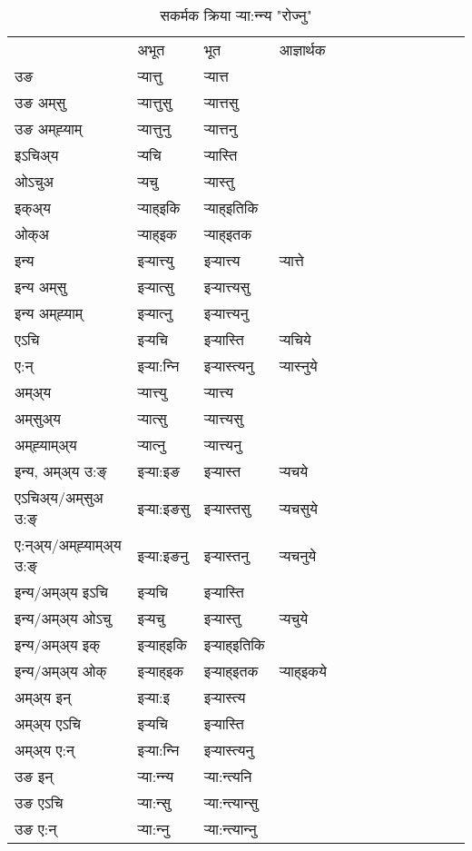 \begin{table}[H]
\centering
\caption{\label{ɛtt.vt} सकर्मक क्रिया  र्‍या:न्‍न्य  "रोज्नु"  }
\begin{tabular}{l|l|l|l|l|l|l|l|l|l|l|l|l}  \toprule
&अभूत & भूत & आज्ञार्थक \\ 
उङ &र्‍यात्तु &र्‍यात्त \\ 
उङ अम्‌सु&र्‍यात्तुसु &र्‍यात्तसु \\ 
उङ अम्‌ह्‍याम्&र्‍यात्तुनु &र्‍यात्तनु \\ 
इऽचिअ्य &र्‍यचि &र्‍यास्ति   \\ 
ओऽचुअ        &र्‍यचु &र्‍यास्तु   \\ 
इक्अ्य&र्‍याह्इकि &र्‍याह्इतिकि   \\ 
ओक्अ &र्‍याह्इक &र्‍याह्इतक   \\ 
इन्य & इर्‍यात्त्यु  & इर्‍यात्त्य &र्‍यात्ते  \\ 
इन्य अम्‌सु& इर्‍यात्सु  & इर्‍यात्त्यसु   \\ 
इन्य अम्‌ह्‍याम्& इर्‍यात्‍नु  & इर्‍यात्त्यनु   \\ 
एऽचि & इर्‍यचि & इर्‍यास्ति &र्‍यचिये    \\ 
ए:न् & इर्‍या:न्‍नि  & इर्‍यास्त्यनु &र्‍यास्‍नुये  \\ 
अम्अ्य & र्‍यात्त्यु  & र्‍यात्त्य  \\ 
अम्‌सुअ्य & र्‍यात्सु & र्‍यात्त्यसु  \\ 
अम्‌ह्‍याम्अ्य & र्‍यात्‍नु  & र्‍यात्त्यनु \\ 
\midrule
इन्य, अम्अ्य उ:ङ्‌ &इर्‍या:इङ &इर्‍यास्त &र्‍यचये \\ 
एऽचिअ्य/अम्‌सुअ उ:ङ्‌ &इर्‍या:इङसु &इर्‍यास्तसु &र्‍यचसुये \\ 
ए:न्अ्य/अम्‌ह्‍याम्अ्य उ:ङ्‌ &इर्‍या:इङनु &इर्‍यास्तनु &र्‍यचनुये \\ 
इन्य/अम्अ्य इऽचि &इर्‍यचि &इर्‍यास्ति    \\ 
इन्य/अम्अ्य ओऽचु &इर्‍यचु &इर्‍यास्तु  &र्‍यचुये  \\ 
इन्य/अम्अ्य इक् &इर्‍याह्इकि &इर्‍याह्इतिकि   \\ 
इन्य/अम्अ्य ओक् &इर्‍याह्इक &इर्‍याह्इतक  &र्‍याह्इकये  \\ 
अम्अ्य इन् & इर्‍या:इ & इर्‍यास्त्य   \\ 
अम्अ्य एऽचि & इर्‍यचि & इर्‍यास्ति    \\ 
अम्अ्य ए:न् & इर्‍या:न्‍नि  & इर्‍यास्त्यनु  \\ 
\midrule
उङ इन् & र्‍या:न्‍न्य  & र्‍या:न्त्यनि  \\ 
उङ एऽचि & र्‍या:न्सु  & र्‍या:न्त्यान्सु   \\ 
उङ ए:न्& र्‍या:न्‍नु  & र्‍या:न्त्यान्‍नु   \\ 
\bottomrule
\end{tabular}
\end{table}


